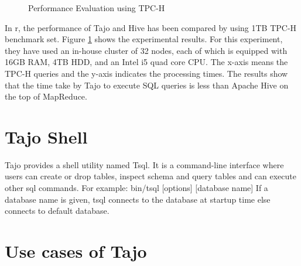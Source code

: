 \documentclass[9pt,twocolumn,twoside]{../../styles/osajnl}
\begin{document}
\begin{figure}[htbp]
\centering
{}
\caption{\cite{tajo-paper} Performance Evaluation using TPC-H}
\label{fig:experiments}
\end{figure}

\noindent
In \cite{tajo-paper}r, the performance of Tajo and Hive has been
compared by using 1TB TPC-H benchmark set. Figure
\ref{fig:experiments} shows the experimental results. For this
experiment, they have used an in-house cluster of 32 nodes, each of
which is equipped with 16GB RAM, 4TB HDD, and an Intel i5 quad core
CPU. The x-axis means the TPC-H queries and the y-axis indicates the
processing times. The results show that the time take by Tajo to
execute SQL queries is less than Apache Hive on the top of MapReduce.

\section{Tajo Shell}
Tajo provides a shell utility named \cite{www-apache-tajo-tsql}
Tsql. It is a command-line interface where users can create or drop
tables, inspect schema and query tables and can execute other sql
commands.\newline \newline
\noindent
For example: bin/tsql [options] [database name] \newline If a database
name is given, tsql connects to the database at startup time else
connects to default database.

\section{Use cases of Tajo}
\end{document}
